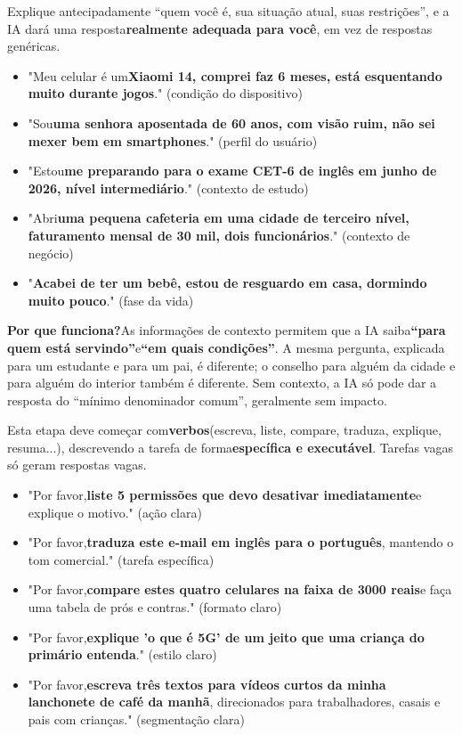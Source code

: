 
Explique antecipadamente “quem você é, sua situação atual, suas restrições”, e a IA dará uma resposta\textbf{realmente adequada para você}, em vez de respostas genéricas.


\begin{itemize}
  \item "Meu celular é um\textbf{Xiaomi 14, comprei faz 6 meses, está esquentando muito durante jogos}." (condição do dispositivo)
  \item "Sou\textbf{uma senhora aposentada de 60 anos, com visão ruim, não sei mexer bem em smartphones}." (perfil do usuário)
  \item "Estou\textbf{me preparando para o exame CET-6 de inglês em junho de 2026, nível intermediário}." (contexto de estudo)
  \item "Abri\textbf{uma pequena cafeteria em uma cidade de terceiro nível, faturamento mensal de 30 mil, dois funcionários}." (contexto de negócio)
  \item "\textbf{Acabei de ter um bebê, estou de resguardo em casa, dormindo muito pouco}." (fase da vida)
\end{itemize}

\textbf{Por que funciona?}As informações de contexto permitem que a IA saiba\textbf{“para quem está servindo”}e\textbf{“em quais condições”}. A mesma pergunta, explicada para um estudante e para um pai, é diferente; o conselho para alguém da cidade e para alguém do interior também é diferente. Sem contexto, a IA só pode dar a resposta do “mínimo denominador comum”, geralmente sem impacto.


Esta etapa deve começar com\textbf{verbos}(escreva, liste, compare, traduza, explique, resuma...), descrevendo a tarefa de forma\textbf{específica e executável}. Tarefas vagas só geram respostas vagas.


\begin{itemize}
  \item "Por favor,\textbf{liste 5 permissões que devo desativar imediatamente}e explique o motivo." (ação clara)
  \item "Por favor,\textbf{traduza este e-mail em inglês para o português}, mantendo o tom comercial." (tarefa específica)
  \item "Por favor,\textbf{compare estes quatro celulares na faixa de 3000 reais}e faça uma tabela de prós e contras." (formato claro)
  \item "Por favor,\textbf{explique 'o que é 5G' de um jeito que uma criança do primário entenda}." (estilo claro)
  \item "Por favor,\textbf{escreva três textos para vídeos curtos da minha lanchonete de café da manhã}, direcionados para trabalhadores, casais e pais com crianças." (segmentação clara)
\end{itemize}


